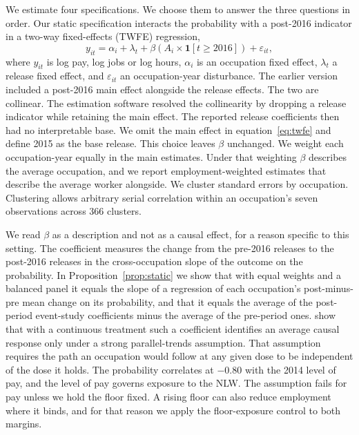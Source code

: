 \documentclass[12pt,leqno]{article}
\begin{document}
We estimate four specifications. We choose them to answer the three questions in order. Our static specification interacts the probability with a post-2016 indicator in a two-way fixed-effects (TWFE) regression,
\begin{equation}\label{eq:twfe}
y_{it} = \alpha_i + \lambda_t + \beta \left( A_i \times \mathbf{1}[t \geq 2016] \right) + \varepsilon_{it},
\end{equation}
where $y_{it}$ is log pay, log jobs or log hours, $\alpha_i$ is an occupation fixed effect, $\lambda_t$ a release fixed effect, and $\varepsilon_{it}$ an occupation-year disturbance. The earlier version included a post-2016 main effect alongside the release effects. The two are collinear. The estimation software resolved the collinearity by dropping a release indicator while retaining the main effect. The reported release coefficients then had no interpretable base. We omit the main effect in equation~\eqref{eq:twfe} and define 2015 as the base release. This choice leaves $\beta$ unchanged. We weight each occupation-year equally in the main estimates. Under that weighting $\beta$ describes the average occupation, and we report employment-weighted estimates that describe the average worker alongside. We cluster standard errors by occupation. Clustering allows arbitrary serial correlation within an occupation's seven observations across 366 clusters.



We read $\beta$ as a description and not as a causal effect, for a reason specific to this setting. The coefficient measures the change from the pre-2016 releases to the post-2016 releases in the cross-occupation slope of the outcome on the probability. In Proposition~\ref{prop:static} we show that with equal weights and a balanced panel it equals the slope of a regression of each occupation's post-minus-pre mean change on its probability, and that it equals the average of the post-period event-study coefficients minus the average of the pre-period ones. \citet{callaway2024continuous} show that with a continuous treatment such a coefficient identifies an average causal response only under a strong parallel-trends assumption. That assumption requires the path an occupation would follow at any given dose to be independent of the dose it holds. The probability correlates at $-0.80$ with the 2014 level of pay, and the level of pay governs exposure to the NLW. The assumption fails for pay unless we hold the floor fixed. A rising floor can also reduce employment where it binds, and for that reason we apply the floor-exposure control to both margins.
\end{document}
